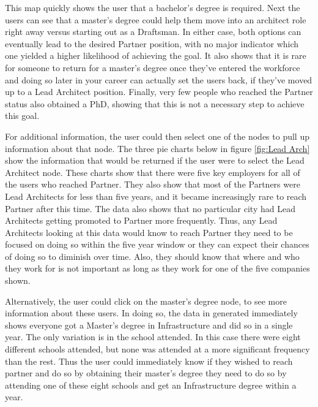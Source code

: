 This map quickly shows the user that a bachelor's degree is required.  Next the
users can see that a master's degree could help them move into an architect
role right away versus starting out as a Draftsman.  In either case, both
options can eventually lead to the desired Partner position, with no major
indicator which one yielded a higher likelihood of achieving the goal.  It also
shows that it is rare for someone to return for a master's degree once they've
entered the workforce and doing so later in your career can actually set the
users back, if they've moved up to a Lead Architect position.  Finally, very
few people who reached the Partner status also obtained a PhD, showing that this
is not a necessary step to achieve this goal.

For additional information, the user could then select one of the nodes to pull
up information about that node.  The three pie charts below in figure
\ref{fig:Lead Arch} show the information that would be returned if the user
were to select the Lead Architect node.  These charts show that there were five
key employers for all of the users who reached Partner.  They also show that
most of the Partners were Lead Architects for less than five years, and it
became increasingly rare to reach Partner after this time.  The data also shows
that no particular city had Lead Architects getting promoted to Partner more
frequently.  Thus, any Lead Architects looking at this data would know to reach
Partner they need to be focused on doing so within the five year window or they
can expect their chances of doing so to diminish over time.  Also, they should
know that where and who they work for is not important as long as they work for
one of the five companies shown.

Alternatively, the user could click on the master's degree node, to see more
information about these users.  In doing so, the data in generated immediately
shows everyone got a Master's degree in Infrastructure and did so in a single
year.  The only variation is in the school attended.  In this case there were
eight different schools attended, but none was attended at a more significant
frequency than the rest.  Thus the user could immediately know if they wished to
reach partner and do so by obtaining their master's degree they need to do so by
attending one of these eight schools and get an Infrastructure degree within a
year.


